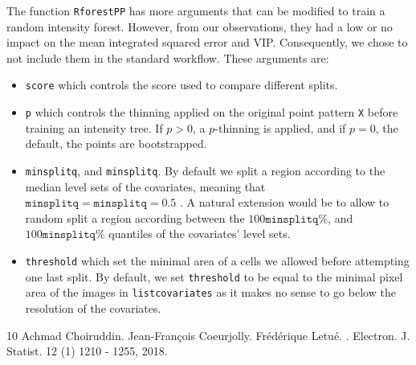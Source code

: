\documentclass[11pt]{article}
\begin{document}
The function \texttt{RforestPP} has more arguments that can be modified to train 
a random intensity forest. 
However, from our observations, they had a low or no impact on the mean integrated squared error and VIP. Consequently, we chose to not include them in the standard workflow.
These arguments are:
\begin{itemize}
  \item \texttt{score} which controls the score used to compare different splits. 
  \item \texttt{p} which controls the thinning applied on the original point pattern 
  \texttt{X} before training an intensity tree. If $p>0$, a $p$-thinning is applied, 
  and if $p=0$, the default, the points are bootstrapped. 
  \item  \texttt{minsplitq}, and \texttt{minsplitq}. By default we split a region
  according to the median level sets of the covariates, meaning that 
  $\texttt{minsplitq}=\texttt{minsplitq} = 0.5$ . A natural extension would 
  be to allow to random split a region according between the $100\texttt{minsplitq}\%$, 
  and $100\texttt{minsplitq}\%$ quantiles of the covariates' level sets.
  \item \texttt{threshold} which set the minimal area of a cells we allowed before attempting   one last split. By default, we set \texttt{threshold} to be 
  equal to the minimal pixel area of the images in \texttt{listcovariates} 
  as it makes no sense to go below the resolution of the covariates.
\end{itemize}


\begin{thebibliography}{10}
Achmad Choiruddin. Jean-François Coeurjolly. Frédérique Letué. 
.
\newblock Electron. J. Statist. 12 (1) 1210 - 1255, 2018.  

\end{thebibliography}
\end{document}
